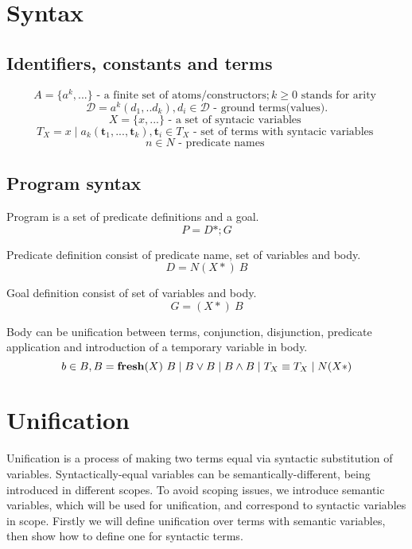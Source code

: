 \documentclass[fleqn]{article}
\begin{document}
\newcommand{\keyword}[1]{\textrm{\textbf{#1}}}
\newcommand{\semantics}[1]{\llbracket#1\rrbracket}
\newcommand{\bigsemantics}[1]{\textbf{[[}#1\textbf{]]}}

\section{Syntax}

\subsection{Identifiers, constants and terms}

\[ A = \{a^k, ...\} \textrm{ - a finite set of atoms/constructors}; k \geq 0 \textrm{ stands for arity }\]
\[ \mathcal{D} = a^k(d_1,..d_k), d_i \in \mathcal{D} \textrm{ - ground terms(values).}\]
\[ X = \{ x,... \} \textrm{ - a set of syntacic variables } \]
\[ T_X = x \mid a_k(\mathbf{t}_1, ..., \mathbf{t}_k), \mathbf{t}_i \in T_X \textrm{ - set of terms with syntacic variables } \]
\[ n \in N \textrm{ - predicate names } \]

\subsection{Program syntax}

Program is a set of predicate definitions and a goal.
\[ P = D*; G \]

Predicate definition consist of predicate name, set of variables and body.
\[ D = N(X*)\ B \]

Goal definition consist of set of variables and body.
\[ G = (X*)\ B \]

Body can be unification between terms, conjunction, disjunction, predicate application and introduction of a temporary variable in body.
\[ b \in B, B = \keyword{fresh}(X)\ B  \mid B \vee B \mid B \wedge B \mid T_X \equiv T_X \mid N(X*) \]

\section{Unification}

Unification is a process of making two terms equal via syntactic substitution of variables\cite{baader90}. Syntactically-equal variables can be semantically-different, being introduced in different scopes. To avoid scoping issues, we introduce semantic variables, which will be used for unification, and correspond to syntactic variables in scope. Firstly we will define unification over terms with semantic variables, then show how to define one for syntactic terms.
\end{document}
